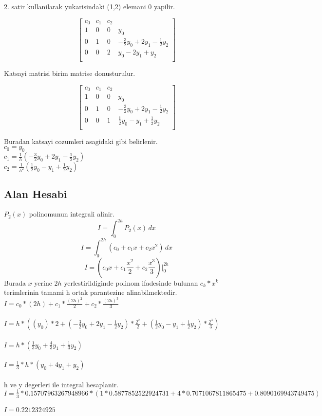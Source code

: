\documentclass{article}
\begin{document}
2. satir kullanilarak  yukarisindaki (1,2) elemani 0 yapilir.\begin{center}
$$ \left[\begin{array}{rrr|r}
c_{0} & c_{1} & c_{2}\\
1 & 0 & 0 & y_{0}\\
0 & 1 & 0 & -\frac{3}{2}y_{0}+2y_{1}-\frac{1}{2}y_{2}\\
0 & 0 & 2 & y_{0}-2y_{1}+y_{2}\\
\end{array}\right] $$
\end{center}
Katsayi matrisi birim matrise donusturulur.
\begin{center}
$$ \left[\begin{array}{rrr|r}
c_{0} & c_{1} & c_{2}\\
1 & 0 & 0 & y_{0}\\
0 & 1 & 0 & -\frac{3}{2}y_{0}+2y_{1}-\frac{1}{2}y_{2}\\
0 & 0 & 1 & \frac{1}{2}y_{0}-y_{1}+\frac{1}{2}y_{2}\\
\end{array}\right] $$
\end{center}
Buradan katsayi cozumleri asagidaki gibi belirlenir.\\
$\displaystyle c_{0}=y_{0}$\\
$\displaystyle c_{1}=\frac{1}{h}(-\frac{3}{2}y_{0}+2y_{1}-\frac{1}{2}y_{2})$\\
$\displaystyle c_{2}=\frac{1}{h^{2}}(\frac{1}{2}y_{0}-y_{1}+\frac{1}{2}y_{2})$\\
\subsection{Alan Hesabi}
$P_{2}(x)$ polinomunun integrali alinir.\\
\[ I=\int_{0}^{2h} P_{2}(x) \,dx \]
\[ I=\int_{0}^{2h} (c_{0}+c_{1}x+c_{2}x^{2}) \,dx \]
\[ I=(c_{0}x+c_{1}\frac{x^{2}}{2}+c_{2}\frac{x^{3}}{3})\bigg\vert_{0}^{2h} \]
Burada $x$ yerine $2h$ yerlestirildiginde polinom ifadesinde bulunan $c_{k}*x^{k}$ terimlerinin tamami h ortak parantezine alinabilmektedir.\\
$\displaystyle I=c_{0}*(2h)+c_{1}*\frac{(2h)^{2}}{2}+c_{2}*\frac{(2h)^{3}}{3}$\\\\
$\displaystyle I=h*((y_{0})*2+(-\frac{3}{2}y_{0}+2y_{1}-\frac{1}{2}y_{2})*\frac{2^{2}}{2}+(\frac{1}{2}y_{0}-y_{1}+\frac{1}{2}y_{2})*\frac{2^{3}}{3})$\\\\
$\displaystyle I=h*(\frac{1}{3}y_{0}+\frac{4}{3}y_{1}+\frac{1}{3}y_{2})$\\\\
$\displaystyle I=\frac{1}{3}*h*(y_{0}+4y_{1}+y_{2})$\\\\
h ve y degerleri ile integral hesaplanir.\\
$\displaystyle I=\frac{1}{3}*0.15707963267948966*(1*0.5877852522924731+4*0.7071067811865475+0.8090169943749475)$\\\\
$\displaystyle I=0.2212324925$\\\\
\end{document}
